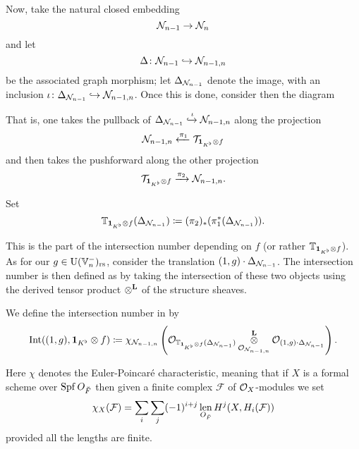 Now, take the natural closed embedding
\[ \mathcal N_{n-1} \to \mathcal N_n \]
and let
\[ \Delta \colon \mathcal N_{n-1} \hookrightarrow \mathcal N_{n-1,n} \]
be the associated graph morphism; let $\Delta_{\mathcal N_{n-1}}$ denote the image,
with an inclusion $\iota \colon \Delta_{\mathcal N_{n-1}} \hookrightarrow \mathcal N_{n-1,n}$.
Once this is done, consider then the diagram
\begin{center}
\end{center}
That is, one takes the pullback of
$\Delta_{\mathcal N_{n-1}} \xhookrightarrow{\iota} \mathcal N_{n-1,n}$
along the projection
\[ \mathcal N_{n-1,n} \xleftarrow{\pi_1} \mathcal{T}_{\mathbf{1}_{K^\flat} \otimes f} \]
and then takes the pushforward along the other projection
\[ \mathcal{T}_{\mathbf{1}_{K^\flat} \otimes f} \xrightarrow{\pi_2} \mathcal N_{n-1,n}. \]
\begin{definition}
  Set
  \[
    \mathbb T_{\mathbf{1}_{K^\flat} \otimes f} (\Delta_{\mathcal N_{n-1}})
    \coloneqq (\pi_2)_\ast(\pi_1^\ast(\Delta_{\mathcal N_{n-1}})).
  \]
\end{definition}
This is the part of the intersection number depending on $f$
(or rather $\mathbb T_{\mathbf{1}_{K^\flat} \otimes f}$).
As for our $g \in \operatorname{U}(\mathbb V_n^-)_{\mathrm{rs}}$,
consider the translation $(1,g) \cdot \Delta_{\mathcal N_{n-1}}$.
The intersection number is then defined as by taking the intersection
of these two objects using the derived tensor product $\mathop{\otimes}^{\mathbf{L}}$ of the structure sheaves.
\begin{definition}
  We define the intersection number in  by
  \[
    \operatorname{Int}((1,g), \mathbf{1}_{K^\flat} \otimes f)
    \coloneqq \chi_{\mathcal N_{n-1,n}} \left(
      \mathcal{O}_{\mathbb T_{\mathbf{1}_{K^\flat} \otimes f} (\Delta_{\mathcal N_{n-1}})}
      \mathop{\otimes}^{\mathbf{L}}_{\mathcal{O}_{\mathcal N_{n-1,n}}} \mathcal{O}_{(1,g) \cdot \Delta_{\mathcal N_{n-1}}} \right).
  \]
  \label{def:intersection_number_inhomog}
\end{definition}
Here $\chi$ denotes the Euler-Poincar\'{e} characteristic,
meaning that if $X$ is a formal scheme over $\operatorname{Spf} O_{\breve F}$
then given a finite complex $\mathcal{F}$ of $\mathcal{O}_X$-modules we set
\[ \chi_X(\mathcal{F}) = \sum_i \sum_j (-1)^{i+j}
  \operatorname*{len}_{O_{\breve F}} H^j(X, H_i(\mathcal F)) \]
provided all the lengths are finite.

